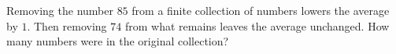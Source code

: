 Removing the number $85$ from a finite collection of numbers lowers the average by $1$. Then removing $74$ from what remains leaves the average unchanged. How many numbers were in the original collection?
